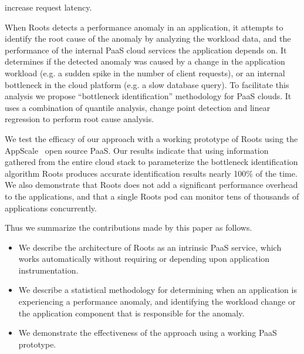 increase request latency.

When Roots detects a performance anomaly in an application, it attempts to
identify the
root cause of the anomaly by analyzing the workload data,
and the performance of the internal PaaS cloud services the application depends on. 
It determines if the detected anomaly was caused by a change in the
application workload (e.g. a sudden spike in the number of client requests), or an internal
bottleneck in the cloud platform (e.g. a slow database query). To facilitate
this
analysis we propose ``bottleneck identification'' methodology
for PaaS clouds. 
It uses a combination of quantile analysis, change point detection
and linear regression to perform root cause analysis. 

We test the efficacy of our approach with a working prototype of 
Roots using the AppScale~\cite{6488671} open source PaaS. 
Our results indicate that using information gathered from the entire cloud
stack to parameterize the bottleneck identification algorithm Roots
produces accurate identification results nearly 100\% of the time. 
We also demonstrate that Roots does not add a significant performance overhead
to the applications, and that a single Roots pod can monitor tens of thousands
of applications concurrently.

Thus we summarize the contributions made by this paper as follows.
\begin{itemize}
\item We describe the architecture of Roots as an intrinsic PaaS
service, which works automatically without requiring or depending upon
application instrumentation.
\item We describe a statistical methodology for determining when an
application is experiencing a performance anomaly, and identifying the 
workload change or the application component that is responsible for the anomaly.
\item We demonstrate the effectiveness of the approach using a working PaaS
prototype.
\end{itemize}

